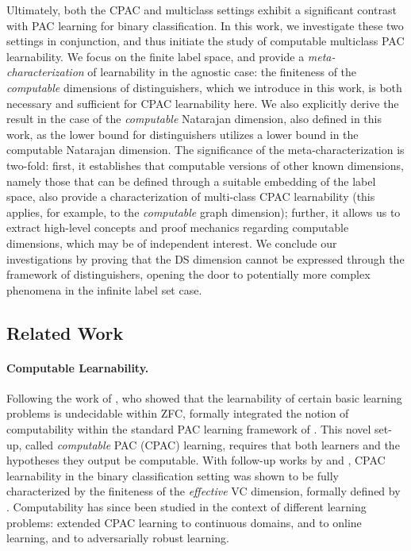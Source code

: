 \documentclass[11pt]{article}
\begin{document}
Ultimately, both the CPAC and multiclass settings  exhibit a significant contrast with PAC learning for binary classification.
In this work, we investigate these two settings in conjunction, and thus initiate the study of computable multiclass PAC learnability. 
We focus on the finite label space, and provide a \emph{meta-characterization} of learnability in the agnostic case: the finiteness of the \emph{computable} dimensions of distinguishers, which we introduce in this work, is both necessary and sufficient for CPAC learnability here.
We also explicitly derive the result in the case of the \emph{computable} Natarajan dimension, also defined in this work, as the lower bound for distinguishers utilizes a lower bound in the computable Natarajan dimension.
The significance of the meta-characterization is two-fold: first, it establishes that computable versions of other known dimensions, namely those that can be defined through a suitable embedding of the label space, also provide a characterization of multi-class CPAC learnability (this applies, for example, to the \emph{computable} graph dimension);  further, it allows us to extract high-level concepts and proof mechanics regarding computable dimensions, which may be of independent interest.
We conclude our investigations by proving that the DS dimension cannot be expressed through the framework of distinguishers, opening the door to potentially more complex phenomena in the infinite label set case.

\subsection{Related Work}

\paragraph{Computable Learnability.}
Following the work of \cite{ben2019learning}, who showed that the learnability of certain basic learning problems is undecidable within ZFC, \cite{agarwal2020learnability} formally integrated the notion of computability within the standard PAC learning framework of \cite{valiant1984theory}.
This novel set-up,  called \emph{computable} PAC (CPAC) learning, requires that both learners and the hypotheses they output be computable.
With follow-up works by \cite{sterkenburg2022characterizations} and \cite{delle2023find}, CPAC learnability in the binary classification setting was shown to be fully characterized by the finiteness of the \emph{effective} VC dimension, formally defined by \cite{delle2023find}.
Computability has since been studied in the context of different learning problems: \cite{ackerman2022computable} extended CPAC learning to continuous domains, \cite{hasrati2023computable} and \cite{delle2024effective} to online learning, and  \cite{gourdeau2024computability} to adversarially robust learning.
\end{document}
